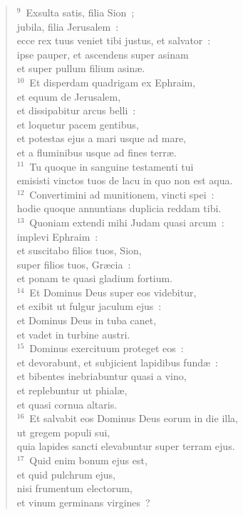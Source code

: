 \begin{flushleft}\begin{verse}${}^{9}$~Exsulta satis, filia Sion~;\\ jubila, filia Jerusalem~:\\ ecce rex tuus veniet tibi justus, et salvator~:\\ ipse pauper, et ascendens super asinam\\ et super pullum filium asin\ae .\\
${}^{10}$~Et disperdam quadrigam ex Ephraim,\\ et equum de Jerusalem,\\ et dissipabitur arcus belli~:\\ et loquetur pacem gentibus,\\ et potestas ejus a mari usque ad mare,\\ et a fluminibus usque ad fines terr\ae .\\
${}^{11}$~Tu quoque in sanguine testamenti tui\\ emisisti vinctos tuos de lacu in quo non est aqua.\\
${}^{12}$~Convertimini ad munitionem, vincti spei~:\\ hodie quoque annuntians duplicia reddam tibi.\\
${}^{13}$~Quoniam extendi mihi Judam quasi arcum~:\\ implevi Ephraim~:\\ et suscitabo filios tuos, Sion,\\ super filios tuos, Gr\ae cia~:\\ et ponam te quasi gladium fortium.\\
${}^{14}$~Et Dominus Deus super eos videbitur,\\ et exibit ut fulgur jaculum ejus~:\\ et Dominus Deus in tuba canet,\\ et vadet in turbine austri.\\
${}^{15}$~Dominus exercituum proteget eos~:\\ et devorabunt, et subjicient lapidibus fund\ae~:\\ et bibentes inebriabuntur quasi a vino,\\ et replebuntur ut phial\ae ,\\ et quasi cornua altaris.\\
${}^{16}$~Et salvabit eos Dominus Deus eorum in die illa,\\ ut gregem populi sui,\\ quia lapides sancti elevabuntur super terram ejus.\\
${}^{17}$~Quid enim bonum ejus est,\\ et quid pulchrum ejus,\\ nisi frumentum electorum,\\ et vinum germinans virgines~?\end{verse}\end{flushleft}


